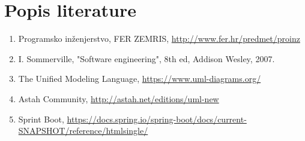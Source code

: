 \chapter*{Popis literature}
		
		\begin{enumerate}
			
			
			\item  Programsko inženjerstvo, FER ZEMRIS, \url{http://www.fer.hr/predmet/proinz}
			
			\item  I. Sommerville, "Software engineering", 8th ed, Addison Wesley, 2007.
			
			
			\item  The Unified Modeling Language, \url{https://www.uml-diagrams.org/}
			
			\item  Astah Community, \url{http://astah.net/editions/uml-new}
			
			\item Sprint Boot, \url{https://docs.spring.io/spring-boot/docs/current-SNAPSHOT/reference/htmlsingle/}
		\end{enumerate}
		
		 